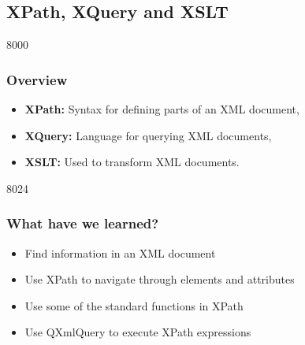 \label{QtXmlPatterns}
\subsection{XPath, XQuery and XSLT}

\begin{slide}{8000}
\frametitle{Overview}

\begin{itemize}
\item \textbf{XPath:} Syntax for defining parts of an XML document,
\item \textbf{XQuery:} Language for querying XML documents,
\item \textbf{XSLT:} Used to transform XML documents.
\end{itemize}

\end{slide}







\begin{slide}[fragile]{8024}
\frametitle{What have we learned?}
\begin{itemize}
\item Find information in an XML document
\item Use XPath to navigate through elements and attributes
\item Use some of the standard functions in XPath
\item Use QXmlQuery to execute XPath expressions
\end{itemize}
\end{slide}
